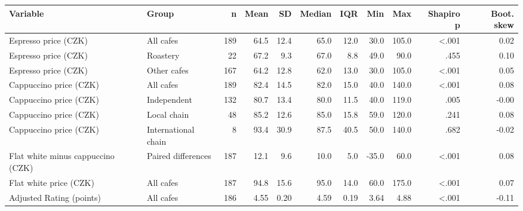 \begin{tabular}{llrrrrrrrrr}
\toprule
Variable & Group & n & Mean & SD & Median & IQR & Min & Max & Shapiro p & Boot. skew \\
\midrule
Espresso price (CZK) & All cafes & 189 & 64.5 & 12.4 & 65.0 & 12.0 & 30.0 & 105.0 & <.001 & 0.02 \\
Espresso price (CZK) & Roastery & 22 & 67.2 & 9.3 & 67.0 & 8.8 & 49.0 & 90.0 & .455 & 0.10 \\
Espresso price (CZK) & Other cafes & 167 & 64.2 & 12.8 & 62.0 & 13.0 & 30.0 & 105.0 & <.001 & 0.05 \\
Cappuccino price (CZK) & All cafes & 189 & 82.4 & 14.5 & 82.0 & 15.0 & 40.0 & 140.0 & <.001 & 0.08 \\
Cappuccino price (CZK) & Independent & 132 & 80.7 & 13.4 & 80.0 & 11.5 & 40.0 & 119.0 & .005 & -0.00 \\
Cappuccino price (CZK) & Local chain & 48 & 85.2 & 12.6 & 85.0 & 15.8 & 59.0 & 120.0 & .241 & 0.08 \\
Cappuccino price (CZK) & International chain & 8 & 93.4 & 30.9 & 87.5 & 40.5 & 50.0 & 140.0 & .682 & -0.02 \\
Flat white minus cappuccino (CZK) & Paired differences & 187 & 12.1 & 9.6 & 10.0 & 5.0 & -35.0 & 60.0 & <.001 & 0.08 \\
Flat white price (CZK) & All cafes & 187 & 94.8 & 15.6 & 95.0 & 14.0 & 60.0 & 175.0 & <.001 & 0.07 \\
Adjusted Rating (points) & All cafes & 186 & 4.55 & 0.20 & 4.59 & 0.19 & 3.64 & 4.88 & <.001 & -0.11 \\
\bottomrule
\end{tabular}
